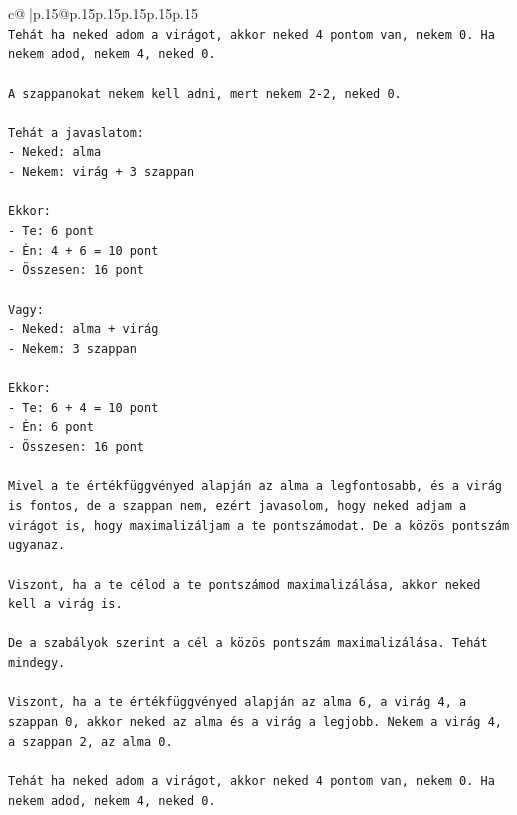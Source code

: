 \documentclass{article}
\begin{document}
{\begin{supertabular}{c@{$\;$}|p{.15\linewidth}@{}p{.15\linewidth}p{.15\linewidth}p{.15\linewidth}p{.15\linewidth}p{.15\linewidth}}
{{{\\ 
\texttt{Tehát ha neked adom a virágot, akkor neked 4 pontom van, nekem 0. Ha nekem adod, nekem 4, neked 0.} \\
\\ 
\texttt{A szappanokat nekem kell adni, mert nekem 2{-}2, neked 0.} \\
\\ 
\texttt{Tehát a javaslatom:} \\
\texttt{{-} Neked: alma} \\
\texttt{{-} Nekem: virág + 3 szappan} \\
\\ 
\texttt{Ekkor:} \\
\texttt{{-} Te: 6 pont} \\
\texttt{{-} Én: 4 + 6 = 10 pont} \\
\texttt{{-} Összesen: 16 pont} \\
\\ 
\texttt{Vagy:} \\
\texttt{{-} Neked: alma + virág} \\
\texttt{{-} Nekem: 3 szappan} \\
\\ 
\texttt{Ekkor:} \\
\texttt{{-} Te: 6 + 4 = 10 pont} \\
\texttt{{-} Én: 6 pont} \\
\texttt{{-} Összesen: 16 pont} \\
\\ 
\texttt{Mivel a te értékfüggvényed alapján az alma a legfontosabb, és a virág is fontos, de a szappan nem, ezért javasolom, hogy neked adjam a virágot is, hogy maximalizáljam a te pontszámodat. De a közös pontszám ugyanaz.} \\
\\ 
\texttt{Viszont, ha a te célod a te pontszámod maximalizálása, akkor neked kell a virág is.} \\
\\ 
\texttt{De a szabályok szerint a cél a közös pontszám maximalizálása. Tehát mindegy.} \\
\\ 
\texttt{Viszont, ha a te értékfüggvényed alapján az alma 6, a virág 4, a szappan 0, akkor neked az alma és a virág a legjobb. Nekem a virág 4, a szappan 2, az alma 0.} \\
\\ 
\texttt{Tehát ha neked adom a virágot, akkor neked 4 pontom van, nekem 0. Ha nekem adod, nekem 4, neked 0.} \\
}}}
\end{supertabular}}
\end{document}
